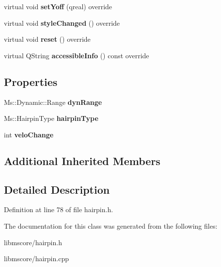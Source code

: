 \begin{DoxyCompactItemize}
virtual void {\bfseries set\+Yoff} (qreal) override
\item 
\mbox{\label{class_ms_1_1_hairpin_a70d150ea422b6259f0c6f3d6ed1b3db7}} 
virtual void {\bfseries style\+Changed} () override
\item 
\mbox{\label{class_ms_1_1_hairpin_ac05706fe1146fc574352dbab005e8eff}} 
virtual void {\bfseries reset} () override
\item 
\mbox{\label{class_ms_1_1_hairpin_ae0b6bcb36a9d6736989bc5fa3b60c953}} 
virtual Q\+String {\bfseries accessible\+Info} () const override
\end{DoxyCompactItemize}
\subsection*{Properties}
\begin{DoxyCompactItemize}
\item 
\mbox{\label{class_ms_1_1_hairpin_adf84bfb82a7ac3495f93538b4151357b}} 
Ms\+::\+Dynamic\+::\+Range {\bfseries dyn\+Range}
\item 
\mbox{\label{class_ms_1_1_hairpin_a7b8679d935e4119b113ff498c45426c4}} 
Ms\+::\+Hairpin\+Type {\bfseries hairpin\+Type}
\item 
\mbox{\label{class_ms_1_1_hairpin_a684019d97e2c63a60f8e8f40c1a6cc75}} 
int {\bfseries velo\+Change}
\end{DoxyCompactItemize}
\subsection*{Additional Inherited Members}


\subsection{Detailed Description}


Definition at line 78 of file hairpin.\+h.



The documentation for this class was generated from the following files\+:\begin{DoxyCompactItemize}
\item 
libmscore/hairpin.\+h\item 
libmscore/hairpin.\+cpp\end{DoxyCompactItemize}
